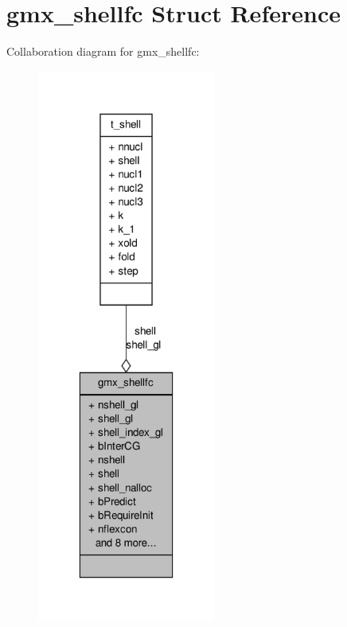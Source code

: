 \hypertarget{structgmx__shellfc}{\section{gmx\-\_\-shellfc \-Struct \-Reference}
\label{structgmx__shellfc}
}


\-Collaboration diagram for gmx\-\_\-shellfc\-:
\nopagebreak
\begin{figure}[H]
\begin{center}
\leavevmode
\includegraphics[width=166pt]{structgmx__shellfc__coll__graph}
\end{center}
\end{figure}
